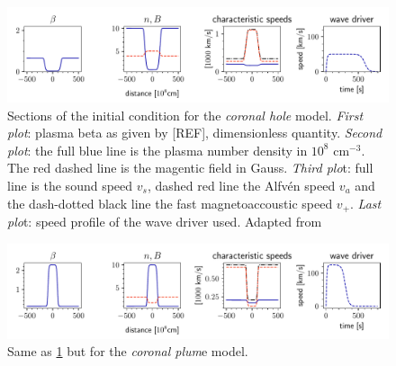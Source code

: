 \begin{figure}[H]
	\centering
	\includegraphics[width=.9\linewidth]{images/sections-initial-condition-hole.pdf}
	\caption{Sections of the initial condition for the \emph{coronal hole} model. 
		\emph{First plot}: plasma beta as given by [REF], dimensionless quantity.
		\emph{Second plot}: the full blue line is the plasma number density in $10^8$ cm$^{-3}$.
The red dashed line is the magentic field in Gauss.
\emph{Third plo}t: full line is the sound speed $v_s$, dashed red line the Alfvén speed $v_a$ and the dash-dotted black line the fast magnetoaccoustic speed $v_+$.
\emph{Last plo}t: speed profile of the wave driver used.
Adapted from \cite{coronal-hole}}
	\label{fig:hole-initial}
\end{figure}

\begin{figure}[H]
	\centering
	\includegraphics[width=.9\linewidth]{images/sections-initial-condition-plume.pdf}
	\caption{Same as \cref{fig:hole-initial} but for the \emph{coronal plum}e model.}
	\label{fig:plume-initial}
\end{figure}

